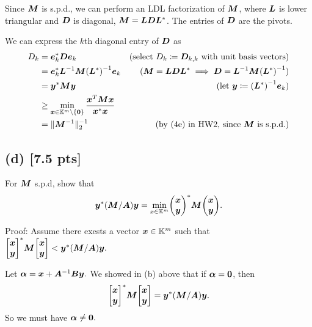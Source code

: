 \documentclass[twoside,10pt]{article}
\begin{document}
\quad Since $\bm{M}$ is s.p.d., we can perform an LDL factorization of $\bm{M}$, where $\bm{L}$ is lower triangular and $\bm{D}$ is diagonal, $\bm{M} = \bm{L}\bm{D}\bm{L}^{*}$.
The entries of $\bm{D}$ are the pivots.

We can express the $k$th diagonal entry of $\bm{D}$ as
\begin{align*}
  D_k &= \vct{e}_k^{*}\mtx{D}\vct{e}_k&\text{(select $D_k \coloneqq \mtx{D}_{k,k}$ with unit basis vectors)}\\
  &= \vct{e}_k^{*}\mtx{L}^{-1}\mtx{M}\left(\mtx{L}^{*}\right)^{-1}\vct{e}_k&\text{($\mtx{M} = \mtx{L}\mtx{D}\mtx{L}^{*} \implies \mtx{D} = \mtx{L}^{-1}\mtx{M}\left(\mtx{L}^{*}\right)^{-1}$)}\\
  &= \vct{y}^{*}\mtx{M}\vct{y}&\text{(let $\vct{y} \coloneqq \left(\mtx{L}^{*}\right)^{-1}\vct{e}_k$)}\\
  &\geq \min \limits_{\vct{x} \in \K^m \setminus \{\vct{0}\}} \frac{\vct{x}^T \mtx{M} \vct{x}}{\vct{x}^{*}\vct{x}}\\
  &= \|\mtx{M}^{-1}\|_{2}^{-1}&\text{(by (4e) in HW2, since $\mtx{M}$ is s.p.d.)}
\end{align*}

\subsection*{(d) [7.5 pts]}
For $\bm{M}$ s.p.d, show that 
\begin{equation} 
  \vct{y}^* \left(\mtx{M} / \mtx{A}\right) \vct{y} = \min \limits_{x \in \K^{m}} 
  \begin{pmatrix}
    \vct{x}\\
    \vct{y} 
  \end{pmatrix}^* 
  \mtx{M}
  \begin{pmatrix}
    \vct{x}\\
    \vct{y} 
  \end{pmatrix}.
\end{equation}

Proof: Assume there exests a vector $\bm{x} \in \mathbb{K}^{m}$ such that $\begin{bmatrix}\vct{x}\\\vct{y}\end{bmatrix}^{*}\mtx{M}\begin{bmatrix}\vct{x}\\\vct{y}\end{bmatrix} < \vct{y}^* \left(\mtx{M} / \mtx{A}\right) \vct{y}.$

Let $\bm{\alpha} = \bm{x} + \bm{A}^{-1}\bm{B}\bm{y}.$
We showed in (b) above that if $\bm{\alpha} = \bm{0}$, then
$$\begin{bmatrix}\vct{x}\\\vct{y}\end{bmatrix}^{*}\mtx{M}\begin{bmatrix}\vct{x}\\\vct{y}\end{bmatrix} = \vct{y}^{*}\left(\mtx{M} / \mtx{A}\right)\vct{y}.$$
So we must have $\bm{\alpha} \neq \bm{0}.$
\end{document}
